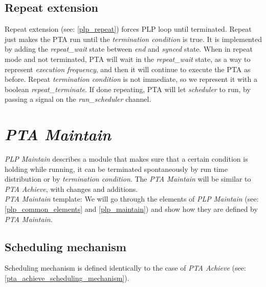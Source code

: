 \subsection{Repeat extension \label{pta_achieve_repeat_extension}}
Repeat extension (see: \ref{plp_repeat}) forces PLP loop until terminated. Repeat just makes the PTA run until the \textit{termination condition} is true. It is implemented by adding the \textcolor{ColorUppaalState}{\textit{repeat_wait}} state between \textcolor{ColorUppaalState}{\textit{end}} and \textcolor{ColorUppaalState}{\textit{synced}} state. When in repeat mode and not terminated, PTA will wait in the \textcolor{ColorUppaalState}{\textit{repeat_wait}} state, as a way to represent \textit{execution frequency}, and then it will continue to execute the PTA as before. Repeat \textit{termination condition} is not immediate, so we represent it with a boolean \textcolor{ColorEdgeGuard}{\textit{repeat_terminate}}. If done repeating, PTA will let\textit{ scheduler }to run, by passing a signal on the \textcolor{ColorUppaalChannel}{\textit{run_scheduler}} channel.\\
\clearpage
\section{\textit{PTA Maintain}}
\textit{PLP Maintain} describes a module that makes sure that a certain condition is holding while running, it can be terminated spontaneously by run time distribution or by \textit{termination condition}. The \textit{PTA Maintain} will be similar to \textit{PTA Achieve}, with changes and additions. \\
\textit{PTA Maintain} template:   We will go through the elements of \textit{PLP Maintain} (see: \ref{plp_common_elements} and \ref{plp_maintain}) and show how they are defined by \textit{PTA Maintain}.\\
\subsection{Scheduling mechanism}
Scheduling mechanism is defined identically to the case of \textit{PTA Achieve} (see: \ref{pta_achieve_scheduling_mechanism}).\\
